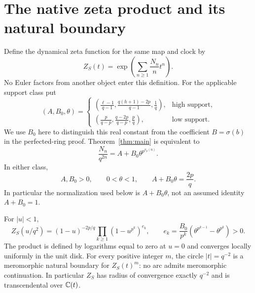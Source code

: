 \section{The native zeta product and its natural boundary}\label{sec:zeta}

Define the dynamical zeta function for the same map and clock by
\begin{equation}\label{eq:zeta-def}
 Z_S(t)=\exp\left(\sum_{n\ge1}\frac{N_n}{n}t^n\right).
\end{equation}
No Euler factors from another object enter this definition.
For the applicable support class put
\begin{equation}\label{eq:ABtheta}
 (A,B_0,\theta)=
 \begin{cases}
 \displaystyle\left(\frac{\ell-1}{q-1},
       \frac{q(h+1)-2p}{q-1},\frac1q\right),&\text{high support},\\[8pt]
 \displaystyle\left(\frac{p}{q-p},
       \frac{q-2p}{q-p},\frac pq\right),&\text{low support}.
 \end{cases}
\end{equation}
We use $B_0$ here to distinguish this real constant from the
coefficient $B=\sigma(b)$ in the perfected-ring proof.
Theorem~\ref{thm:main} is equivalent to
\begin{equation}\label{eq:normalized-count}
 \frac{N_n}{q^{2n}}=A+B_0\theta^{p^{v_p(n)}}.
\end{equation}
In either class,
\begin{equation}\label{eq:positive-parameters}
 A,B_0>0,\qquad 0<\theta<1,\qquad A+B_0\theta=\frac{2p}{q}.
\end{equation}
In particular the normalization used below is $A+B_0\theta$,
not an assumed identity $A+B_0=1$.

\begin{theorem}\label{thm:zeta}
For $|u|<1$,
\begin{equation}\label{eq:zeta-product}
 Z_S(u/q^2)=(1-u)^{-2p/q}
       \prod_{k\ge1}(1-u^{p^k})^{e_k},\qquad
 e_k=\frac{B_0}{p^k}
       \left(\theta^{p^{k-1}}-\theta^{p^k}\right)>0.
\end{equation}
The product is defined by logarithms equal to zero at $u=0$ and
converges locally uniformly in the unit disk. For every positive
integer $m$, the circle $|t|=q^{-2}$ is a meromorphic natural
boundary for $Z_S(t)^m$: no arc admits meromorphic continuation.
In particular $Z_S$ has radius of convergence exactly $q^{-2}$
and is transcendental over $\mathbb C(t)$.
\end{theorem}

